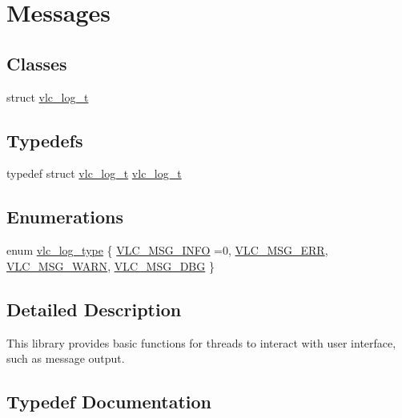 \hypertarget{group__messages}{}\section{Messages}
\label{group__messages}
\subsection*{Classes}
\begin{DoxyCompactItemize}
\item 
struct \hyperlink{structvlc__log__t}{vlc\+\_\+log\+\_\+t}
\end{DoxyCompactItemize}
\subsection*{Typedefs}
\begin{DoxyCompactItemize}
\item 
typedef struct \hyperlink{structvlc__log__t}{vlc\+\_\+log\+\_\+t} \hyperlink{group__messages_ga5521c6c2a7380a8c9b2ee76c848f3d3f}{vlc\+\_\+log\+\_\+t}
\end{DoxyCompactItemize}
\subsection*{Enumerations}
\begin{DoxyCompactItemize}
\item 
enum \hyperlink{group__messages_gaac9d92208890aa567a07ca9a1d758303}{vlc\+\_\+log\+\_\+type} \{ \hyperlink{group__messages_ggaac9d92208890aa567a07ca9a1d758303a5a18a01125698fb2d3c14c167350f9d6}{V\+L\+C\+\_\+\+M\+S\+G\+\_\+\+I\+N\+FO} =0, 
\hyperlink{group__messages_ggaac9d92208890aa567a07ca9a1d758303a8e54bab5e1a7da0fc1956ed354d77c5d}{V\+L\+C\+\_\+\+M\+S\+G\+\_\+\+E\+RR}, 
\hyperlink{group__messages_ggaac9d92208890aa567a07ca9a1d758303ac043fb17268a3f593b5296f12f13fa6b}{V\+L\+C\+\_\+\+M\+S\+G\+\_\+\+W\+A\+RN}, 
\hyperlink{group__messages_ggaac9d92208890aa567a07ca9a1d758303a471093ff5e508b3165c091e61312cd01}{V\+L\+C\+\_\+\+M\+S\+G\+\_\+\+D\+BG}
 \}
\end{DoxyCompactItemize}


\subsection{Detailed Description}
This library provides basic functions for threads to interact with user interface, such as message output. 

\subsection{Typedef Documentation}
\mbox{\label{group__messages_ga5521c6c2a7380a8c9b2ee76c848f3d3f}} 

